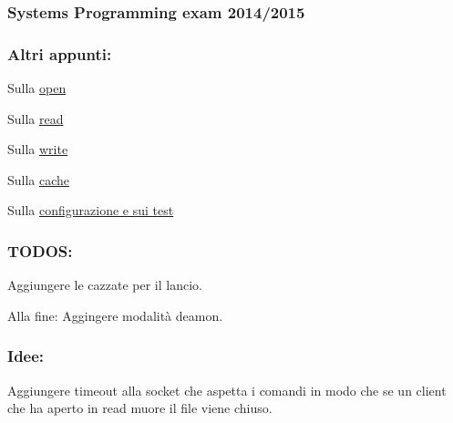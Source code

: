 \subsubsection*{Systems Programming exam 2014/2015}

\subsubsection*{Altri appunti\+:}


\begin{DoxyItemize}
\item Sulla \hyperlink{md_OPE}{open}
\item Sulla \hyperlink{md_READ}{read}
\item Sulla \hyperlink{md_WRITE}{write}
\item Sulla \hyperlink{md_Cache}{cache}
\item Sulla \hyperlink{md_Test}{configurazione e sui test}
\end{DoxyItemize}

\subsubsection*{T\+O\+D\+O\+S\+:}


\begin{DoxyItemize}
\item Aggiungere le cazzate per il lancio.
\item Alla fine\+: Aggingere modalità deamon.
\end{DoxyItemize}

\subsubsection*{Idee\+:}


\begin{DoxyItemize}
\item Aggiungere timeout alla socket che aspetta i comandi in modo che se un client che ha aperto in read muore il file viene chiuso. 
\end{DoxyItemize}